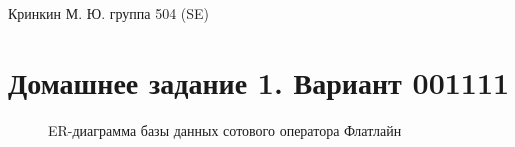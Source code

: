 \documentclass[a4paper,12pt]{article}
\begin{document}
\sloppy

\lstset{
	basicstyle=\small,
	stringstyle=\ttfamily,
	showstringspaces=false,
	columns=fixed,
	breaklines=true,
	numbers=right,
	numberstyle=\tiny
}

\newtheorem{Def}{Определение}[section]
\newtheorem{Th}{Теорема}
\newtheorem{Lem}[Th]{Лемма}
\newenvironment{Proof}
	{\par\noindent{\bf Доказательство.}}
	{\hfill$\scriptstyle\blacksquare$}
\newenvironment{Solution}
	{\par\noindent{\bf Решение.}}
	{\hfill$\scriptstyle\blacksquare$}


\begin{flushright}
	Кринкин М. Ю. группа 504 (SE)
\end{flushright}

\section{Домашнее задание 1. Вариант 001111}

\begin{figure}[h]
	\noindent{}
	\caption{ER-диаграмма базы данных сотового оператора Флатлайн}
	\label{pic::er_diag}
\end{figure}
\end{document}
